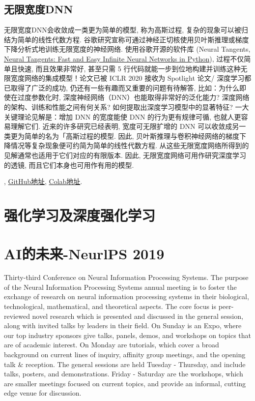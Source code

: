 \subsection{无限宽度DNN}
无限宽度DNN会收敛成一类更为简单的模型, 称为高斯过程, 复杂的现象可以被归结为简单的线性代数方程.
谷歌研究宣称可通过神经正切核使用贝叶斯推理或梯度下降分析式地训练无限宽度的神经网络. 使用谷歌开源的软件库 (Neural Tangents, \href{www.github.com/google/neural-tangents}{Neural Tangents: Fast and Easy Infinite Neural Networks in Python}),
过程不仅简单且快速, 而且效果非常好, 甚至只需 5 行代码就能一步到位地构建并训练这种无限宽度网络的集成模型！论文已被 ICLR 2020 接收为 Spotlight 论文/
深度学习都已取得了广泛的成功, 仍还有一些有趣而又重要的问题有待解答, 比如：为什么即使在过度参数化时, 深度神经网络（DNN）也能取得非常好的泛化能力? 深度网络的架构、训练和性能之间有何关系? 如何提取出深度学习模型中的显著特征?
一大关键理论见解是：增加 DNN 的宽度能使 DNN 的行为更有规律可循, 也就人更容易理解它们. 近来的许多研究已经表明, 宽度可无限扩增的 DNN 可以收敛成另一类更为简单的名为「高斯过程的模型. 因此, 贝叶斯推理与卷积神经网络的梯度下降情况等复杂现象便可约简为简单的线性代数方程.
从这些无限宽度网络所得到的见解通常也适用于它们对应的有限版本. 因此, 无限宽度网络可用作研究深度学习的透镜, 而且它们本身也可用作有用的模型.

\href{https://arxiv.org/abs/1912.02803{论文地址}},
\href{https://ai.googleblog.com/2020/03/fast-and-easy-infinitely-wide-networks.html}
\href{https://github.com/google/neural-tangents}{GitHub地址},
\href{https://colab.research.google.com/github/google/neural-tangents/blob/master/notebooks/neural_tangents_cookbook.ipynb}{Colab地址}.

\section{强化学习及深度强化学习}
\section{AI的未来-NeurlPS 2019}
Thirty-third Conference on Neural Information Processing Systems. The purpose of the Neural Information Processing Systems annual meeting is to foster the exchange of research on neural information processing systems in their biological, technological, mathematical, and theoretical aspects. The core focus is peer-reviewed novel research which is presented and discussed in the general session, along with invited talks by leaders in their field. On Sunday is an Expo, where our top industry sponsors give talks, panels, demos, and workshops on topics that are of academic interest. On Monday are tutorials, which cover a broad background on current lines of inquiry, affinity group meetings, and the opening talk \& reception. The general sessions are held Tuesday - Thursday, and include talks, posters, and demonstrations. Friday - Saturday are the workshops, which are smaller meetings focused on current topics, and provide an informal, cutting edge venue for discussion.

